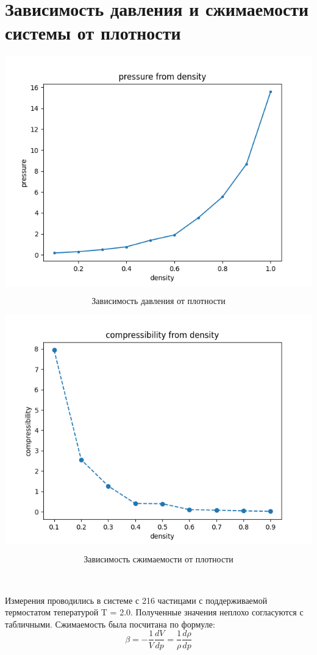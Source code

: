 \documentclass[a4paper, 12pt]{article}
\begin{document}
\section{Зависимость давления и сжимаемости системы от плотности}
\begin{minipage}{0.47\textwidth}
\begin{center}
\includegraphics[scale=0.6]{pressure}
\end{center}
\[\textit{Зависимость давления от плотности}\]
\end{minipage}
\begin{minipage}{0.47\textwidth}
\begin{center}
\includegraphics[scale=0.6]{comp}
\end{center}
\[\textit{Зависимость сжимаемости от плотности}\]
\end{minipage}\\\\
Измерения проводились в системе с 216 частицами с поддерживаемой термостатом тепературой T = 2.0. Полученные значения неплохо согласуются с табличными. Сжимаемость была посчитана по формуле:
\[\beta = -\frac{1}{V}\frac{dV}{dp} = \frac{1}{\rho}\frac{d\rho}{dp}\]
\end{document}
